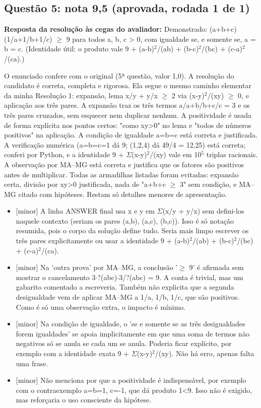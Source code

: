 \documentclass{article}%
\begin{document}
\subsection*{Questão 5: nota 9,5 (aprovada, rodada 1 de 1)}%
\textbf{Resposta da resolução às cegas do avaliador:} Demonstrado: (a+b+c)(1/a+1/b+1/c) $\geq$ 9 para todos a, b, c > 0, com igualdade se, e somente se, a = b = c. (Identidade útil: o produto vale 9 + (a-b)$^2$/(ab) + (b-c)$^2$/(bc) + (c-a)$^2$/(ca).)\par %
O enunciado confere com o original (5ª questão, valor 1,0). A resolução do candidato é correta, completa e rigorosa. Ela segue o mesmo caminho elementar da minha Resolução 1: expansão, lema x/y + y/x $\geq$ 2 via (x-y)$^2$/(xy) $\geq$ 0, e aplicação aos três pares. A expansão traz os três termos a/a+b/b+c/c = 3 e os três pares cruzados, sem esquecer nem duplicar nenhum. A positividade é usada de forma explícita nos pontos certos: "como xy>0" no lema e "todos de números positivos" na aplicação. A condição de igualdade a=b=c está correta e justificada. A verificação numérica (a=b=c=1 dá 9; (1,2,4) dá 49/4 = 12,25) está correta; conferi por Python, e a identidade 9 + $\Sigma$(x-y)$^2$/(xy) vale em 10$^{5}$ triplas racionais. A observação por MA--MG está correta e justifica que os fatores são positivos antes de multiplicar. Todas as armadilhas listadas foram evitadas: expansão certa, divisão por xy>0 justificada, nada de "a+b+c $\geq$ 3" sem condição, e MA--MG citado com hipóteses. Restam só detalhes menores de apresentação.%
\begin{itemize}%
\item%
{[}minor{]} A linha ANSWER final usa x e y em $\Sigma$(x/y + y/x) sem defini{-}los naquele contexto (seriam os pares (a,b), (a,c), (b,c)). Isso é só notação resumida, pois o corpo da solução define tudo. Seria mais limpo escrever os três pares explicitamente ou usar a identidade 9 + (a-b)$^2$/(ab) + (b-c)$^2$/(bc) + (c-a)$^2$/(ca).%
\item%
{[}minor{]} Na 'outra prova' por MA--MG, a conclusão '$\geq$ 9' é afirmada sem mostrar o cancelamento 3$\cdot$?(abc)$\cdot$3/?(abc) = 9. A conta é trivial, mas um gabarito comentado a escreveria. Também não explicita que a segunda desigualdade vem de aplicar MA--MG a 1/a, 1/b, 1/c, que são positivos. Como é só uma observação extra, o impacto é mínimo.%
\item%
{[}minor{]} Na condição de igualdade, o 'se e somente se as três desigualdades forem igualdades' se apoia implicitamente em que uma soma de termos não negativos só se anula se cada um se anula. Poderia ficar explícito, por exemplo com a identidade exata 9 + $\Sigma$(x-y)$^2$/(xy). Não há erro, apenas falta uma frase.%
\item%
{[}minor{]} Não menciona por que a positividade é indispensável, por exemplo com o contraexemplo a=b=1, c=-1, que dá produto 1<9. Isso não é exigido, mas reforçaria o uso consciente da hipótese.%
\end{itemize}%
\end{document}
